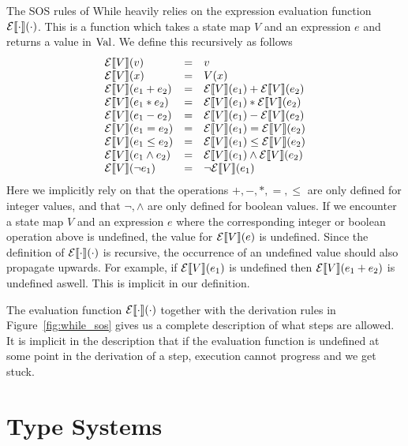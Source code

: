 The SOS rules of While heavily relies on the expression evaluation function
$\mathcal{E}\llbracket \cdot \rrbracket(\cdot)$. This is a function which takes a state map $V$ and an
expression $e$ and returns a value in $\mbox{$\mathrm{Val}$}$. We define this recursively as follows
\begin{equation*}
  \begin{array}{lll}
    \mathcal{E}\llbracket V \rrbracket(v) &=& v \\
    \mathcal{E}\llbracket V \rrbracket(x) &=& V(x) \\
    \mathcal{E}\llbracket V \rrbracket(e_1 + e_2) &=& \mathcal{E}\llbracket V \rrbracket(e_1) + \mathcal{E}\llbracket V \rrbracket(e_2) \\
    \mathcal{E}\llbracket V \rrbracket(e_1 * e_2) &=& \mathcal{E}\llbracket V \rrbracket(e_1) * \mathcal{E}\llbracket V \rrbracket(e_2) \\
    \mathcal{E}\llbracket V \rrbracket(e_1 - e_2) &=& \mathcal{E}\llbracket V \rrbracket(e_1) - \mathcal{E}\llbracket V \rrbracket(e_2) \\
    \mathcal{E}\llbracket V \rrbracket(e_1 = e_2) &=& \mathcal{E}\llbracket V \rrbracket(e_1) = \mathcal{E}\llbracket V \rrbracket(e_2) \\
    \mathcal{E}\llbracket V \rrbracket(e_1 \leq e_2) &=& \mathcal{E}\llbracket V \rrbracket(e_1) \leq \mathcal{E}\llbracket V \rrbracket(e_2) \\
    \mathcal{E}\llbracket V \rrbracket(e_1 \land e_2) &=& \mathcal{E}\llbracket V \rrbracket(e_1) \land \mathcal{E}\llbracket V \rrbracket(e_2) \\
    \mathcal{E}\llbracket V \rrbracket(\lnot e_1) &=& \lnot \mathcal{E}\llbracket V \rrbracket(e_1) \\
  \end{array}
\end{equation*}
Here we implicitly rely on that the operations $+, -, *, =, \leq$ are only
defined for integer values, and that $\lnot, \land$ are only defined for boolean
values.  If we encounter a state map $V$ and an expression $e$ where the
corresponding integer or boolean operation above is undefined, the value for
$\mathcal{E}\llbracket V \rrbracket(e)$ is undefined. Since the definition of $\mathcal{E}\llbracket \cdot \rrbracket(\cdot)$ is
recursive, the occurrence of an undefined value should also propagate upwards.
For example, if $\mathcal{E}\llbracket V \rrbracket(e_1)$ is undefined then $\mathcal{E}\llbracket V \rrbracket(e_1 + e_2)$ is undefined
aswell. This is implicit in our definition.

The evaluation function $\mathcal{E}\llbracket \cdot \rrbracket(\cdot)$ together with the derivation
rules in Figure~\ref{fig:while_sos} gives us a complete description of what
steps are allowed. It is implicit in the description that if the evaluation
function is undefined at some point in the derivation of a step, execution
cannot progress and we get stuck.

\section{Type Systems} \label{sec:type_systems}

